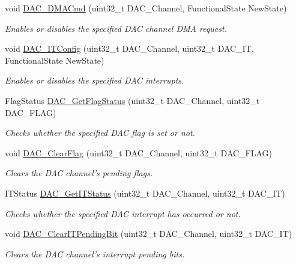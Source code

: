 \begin{DoxyCompactItemize}
void \hyperlink{group___d_a_c_ga194cba38f60ace11658824f0250121f4}{D\-A\-C\-\_\-\-D\-M\-A\-Cmd} (uint32\-\_\-t D\-A\-C\-\_\-\-Channel, Functional\-State New\-State)
\begin{DoxyCompactList}\small\item\em Enables or disables the specified D\-A\-C channel D\-M\-A request. \end{DoxyCompactList}\item 
void \hyperlink{group___d_a_c_ga12d7495b30eae40c2570118cabbda1c3}{D\-A\-C\-\_\-\-I\-T\-Config} (uint32\-\_\-t D\-A\-C\-\_\-\-Channel, uint32\-\_\-t D\-A\-C\-\_\-\-I\-T, Functional\-State New\-State)
\begin{DoxyCompactList}\small\item\em Enables or disables the specified D\-A\-C interrupts. \end{DoxyCompactList}\item 
Flag\-Status \hyperlink{group___d_a_c_ga9ee60b78f0ccd23bfbe54bce2a2f909b}{D\-A\-C\-\_\-\-Get\-Flag\-Status} (uint32\-\_\-t D\-A\-C\-\_\-\-Channel, uint32\-\_\-t D\-A\-C\-\_\-\-F\-L\-A\-G)
\begin{DoxyCompactList}\small\item\em Checks whether the specified D\-A\-C flag is set or not. \end{DoxyCompactList}\item 
void \hyperlink{group___d_a_c_ga49543c52786d70d6b6311f3fee856d37}{D\-A\-C\-\_\-\-Clear\-Flag} (uint32\-\_\-t D\-A\-C\-\_\-\-Channel, uint32\-\_\-t D\-A\-C\-\_\-\-F\-L\-A\-G)
\begin{DoxyCompactList}\small\item\em Clears the D\-A\-C channel's pending flags. \end{DoxyCompactList}\item 
I\-T\-Status \hyperlink{group___d_a_c_ga541aac3b50db3a8a806ec5ef30679aca}{D\-A\-C\-\_\-\-Get\-I\-T\-Status} (uint32\-\_\-t D\-A\-C\-\_\-\-Channel, uint32\-\_\-t D\-A\-C\-\_\-\-I\-T)
\begin{DoxyCompactList}\small\item\em Checks whether the specified D\-A\-C interrupt has occurred or not. \end{DoxyCompactList}\item 
void \hyperlink{group___d_a_c_ga12d90e69a2642997136b23224d180641}{D\-A\-C\-\_\-\-Clear\-I\-T\-Pending\-Bit} (uint32\-\_\-t D\-A\-C\-\_\-\-Channel, uint32\-\_\-t D\-A\-C\-\_\-\-I\-T)
\begin{DoxyCompactList}\small\item\em Clears the D\-A\-C channel's interrupt pending bits. \end{DoxyCompactList}\end{DoxyCompactItemize}


